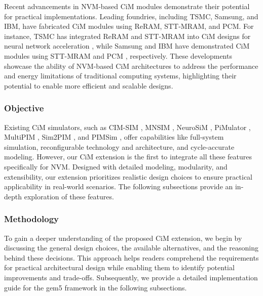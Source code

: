 Recent advancements in NVM-based CiM modules demonstrate their potential for practical implementations. Leading foundries, including TSMC, Samsung, and IBM, have fabricated CiM modules using ReRAM, STT-MRAM, and PCM. For instance, TSMC has integrated ReRAM and STT-MRAM into CiM designs for neural network acceleration \cite{kit/stt-tsmc1,kit/reram-tsmc4}, while Samsung and IBM have demonstrated CiM modules using STT-MRAM and PCM \cite{kit/pcm-ibm3,kit/stt-samsung2}, respectively. These developments showcase the ability of NVM-based CiM architectures to address the performance and energy limitations of traditional computing systems, highlighting their potential to enable more efficient and scalable designs.



\subsubsection{Objective}

Existing CiM simulators, such as CIM-SIM \cite{CIM-SIM}, MNSIM \cite{MNSIM}, NeuroSiM \cite{NEUROSIM}, PiMulator \cite{PiMulator}, MultiPIM \cite{MultiPIM}, Sim2PIM \cite{Sim2PIM}, and PIMSim \cite{PIMSim}, offer capabilities like full-system simulation, reconfigurable technology and architecture, and cycle-accurate modeling.
However, our CiM extension is the first to integrate all these features specifically for NVM.
Designed with detailed modeling, modularity, and extensibility,
our extension prioritizes realistic design choices to ensure practical applicability in real-world scenarios.
The following subsections provide an in-depth exploration of these features.


\subsubsection{Methodology}

To gain a deeper understanding of the proposed CiM extension, we begin by discussing the general design choices, the available alternatives, and the reasoning behind these decisions. This approach helps readers comprehend the requirements for practical architectural design while enabling them to identify potential improvements and trade-offs. Subsequently, we provide a detailed implementation guide for the gem5 framework in the following subsections.


